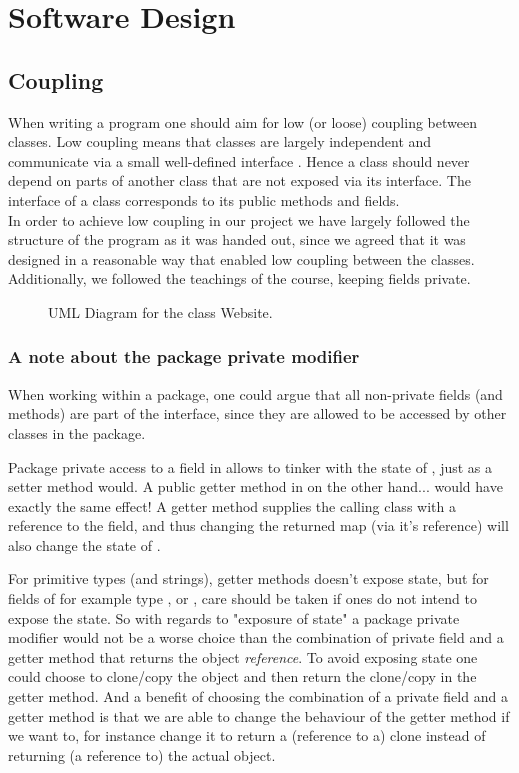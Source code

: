 \section{Software Design}

\subsection{Coupling}
When writing a program one should aim for low (or loose) coupling between classes. Low coupling means that classes are largely independent and communicate via a small well-defined interface \cite[p.259]{BK}. Hence a class should never depend on parts of another class that are not exposed via its interface. The interface of a class corresponds to its public methods and fields.
\\
In order to achieve low coupling in our project we have largely followed the structure of the program as it was handed out, since we agreed that it was designed in a reasonable way that enabled low coupling between the classes. Additionally, we followed the teachings of the course, keeping fields private.

 \begin{figure}[t]
	\centering
	\caption{UML Diagram for the class Website.}
	\label{fig:uml:single-class-website}
\end{figure}

 
\subsubsection{A note about the package private modifier}
When working within a package, one could argue that all non-private fields (and methods) are part of the interface, since they are allowed to be accessed by other classes in the package. 
 
Package private access to a field in  allows  to tinker with the state of , just as a setter method would.
A public getter method in  on the other hand... would have exactly the same effect!
A getter method supplies the calling class  with a reference to the field, and thus changing the returned map (via it's reference) will also change the state of .
 
For primitive types (and strings), getter methods doesn't expose state, but for fields of for example type ,  or , care should be taken if ones do not intend to expose the state.
So with regards to "exposure of state" a package private modifier would not be a worse choice than the combination of private field and a getter method that returns the object \emph{reference}. To avoid exposing state one could choose to clone/copy the object and then return the clone/copy in the getter method.
And a benefit of choosing the combination of a private field and a getter method is that we are able to change the behaviour of the getter method if we want to, for instance change it to return a (reference to a) clone instead of returning (a reference to) the actual object. 

